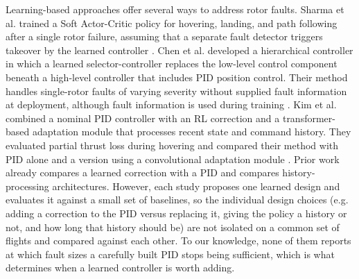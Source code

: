 \documentclass[12pt,letterpaper]{article}
\begin{document}
Learning-based approaches offer several ways to address rotor faults. Sharma et al. trained a Soft Actor-Critic policy for hovering, landing, and path following after a single rotor failure, assuming that a separate fault detector triggers takeover by the learned controller \citep{sharma2021modelfreedeepreinforcementlearning}. Chen et al. developed a hierarchical controller in which a learned selector-controller replaces the low-level control component beneath a high-level controller that includes PID position control. Their method handles single-rotor faults of varying severity without supplied fault information at deployment, although fault information is used during training \citep{chen2025learningbasedpassivefaulttolerantcontrol}. Kim et al. combined a nominal PID controller with an RL correction and a transformer-based adaptation module that processes recent state and command history. They evaluated partial thrust loss during hovering and compared their method with PID alone and a version using a convolutional adaptation module \citep{kim2025reinforcementlearningbasedfaulttolerantcontrol}. Prior work already compares a learned correction with a PID and compares history-processing architectures. However, each study proposes one learned design and evaluates it against a small set of baselines, so the individual design choices (e.g. adding a correction to the PID versus replacing it, giving the policy a history or not, and how long that history should be) are not isolated on a common set of flights and compared against each other. To our knowledge, none of them reports at which fault sizes a carefully built PID stops being sufficient, which is what determines when a learned controller is worth adding.
\end{document}
